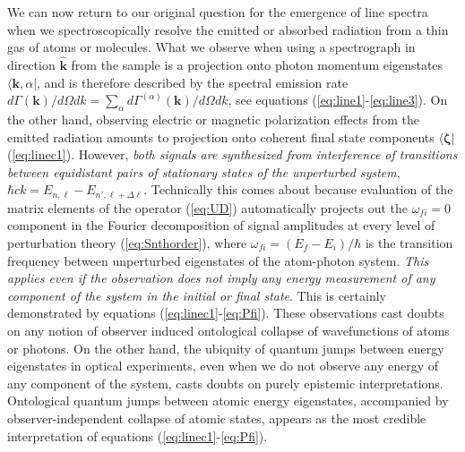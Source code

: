 \documentclass[final,3p,12pt]{elsarticle3}
\begin{document}
We can now return to our original question for the emergence of line
spectra when we spectroscopically resolve the emitted or absorbed
radiation from a thin gas of atoms or molecules. What we observe when 
using a spectrograph in direction $\hat{\bm{k}}$ from the sample is a 
projection onto photon momentum eigenstates $\bm{\langle}\bm{k},\alpha\bm{|}$, 
and is therefore described by the spectral emission 
rate $d\Gamma(\bm{k})/d\Omega dk=\sum_\alpha d\Gamma^{(\alpha)}(\bm{k})/d\Omega dk$, 
see equations (\ref{eq:line1}-\ref{eq:line3}). On the other hand, observing 
electric or magnetic polarization effects from the emitted radiation amounts 
to projection onto coherent final state components $\bm{\langle}\bm{\zeta}\bm{|}$
(\ref{eq:linec1}). However, {\it both signals are synthesized from 
interference of transitions between equidistant pairs of stationary 
states of the unperturbed system}, $\hbar ck=E_{n,\ell}-E_{n',\ell+\Delta\ell}$.
Technically this comes about because evaluation of the matrix elements of 
the operator (\ref{eq:UD}) automatically projects out the $\omega_{fi}=0$
component in the Fourier decomposition of signal amplitudes at every level 
of perturbation theory (\ref{eq:Snthorder}), where $\omega_{fi}=(E_f-E_i)/\hbar$ 
is the transition frequency between unperturbed eigenstates of the atom-photon 
system. {\it This applies even if the observation does not imply any energy 
measurement of any component of the system in the initial or final state}. 
This is certainly demonstrated by equations (\ref{eq:linec1}-\ref{eq:Pfi}).
These observations cast doubts on any notion of observer induced ontological
collapse of wavefunctions of atoms or photons.
On the other hand, the ubiquity of quantum jumps between energy eigenstates 
in optical experiments, even when we do not observe any energy of any 
component of the system, casts doubts on purely epistemic interpretations.
Ontological quantum jumps between atomic energy eigenstates, accompanied
by observer-independent collapse of atomic states, appears as the most
credible interpretation of equations (\ref{eq:linec1}-\ref{eq:Pfi}).
\end{document}
